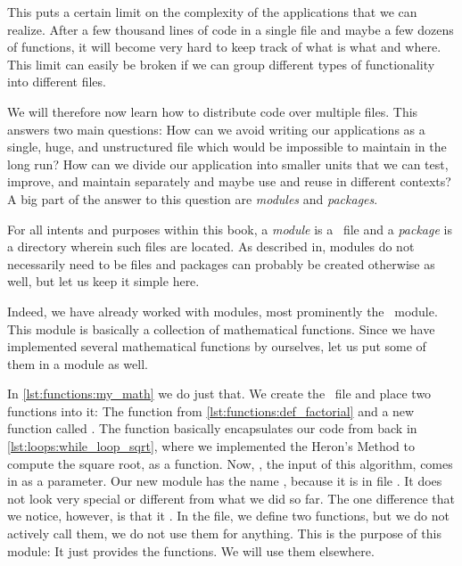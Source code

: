 This puts a certain limit on the complexity of the applications that we can realize.
After a few thousand lines of code in a single file and maybe a few dozens of functions, it will become very hard to keep track of what is what and where.
This limit can easily be broken if we can group different types of functionality into different files.

We will therefore now learn how to distribute code over multiple files.
This answers two main questions:
How can we avoid writing our applications as a single, huge, and unstructured file which would be impossible to maintain in the long run?
How can we divide our application into smaller units that we can test, improve, and maintain separately and maybe use and reuse in different contexts?
A big part of the answer to this question are \emph{modules} and \emph{packages}.

For all intents and purposes within this book, a \emph{module} is a \python\ file and a \emph{package} is a directory wherein such files are located.
As described in, modules do not necessarily need to be files and packages can probably be created otherwise as well, but let us keep it simple here.

Indeed, we have already worked with modules, most prominently the~ module.
This module is basically a collection of mathematical functions.
Since we have implemented several mathematical functions by ourselves, let us put some of them in a module as well.

In \cref{lst:functions:my_math} we do just that.
We create the \python\ file  and place two functions into it:
The function  from \cref{lst:functions:def_factorial} and a new function called .
The  function basically encapsulates our code from back in \cref{lst:loops:while_loop_sqrt}, where we implemented the Heron's Method to compute the square root, as a function.
Now, , the input of this algorithm, comes in as a parameter.%
%
%
%
Our new module has the name , because it is in file .
It does not look very special or different from what we did so far.
The one difference that we notice, however, is that it .
In the file, we define two functions, but we do not actively call them, we do not use them for anything.
This is the purpose of this module:
It just provides the functions.
We will use them elsewhere.

